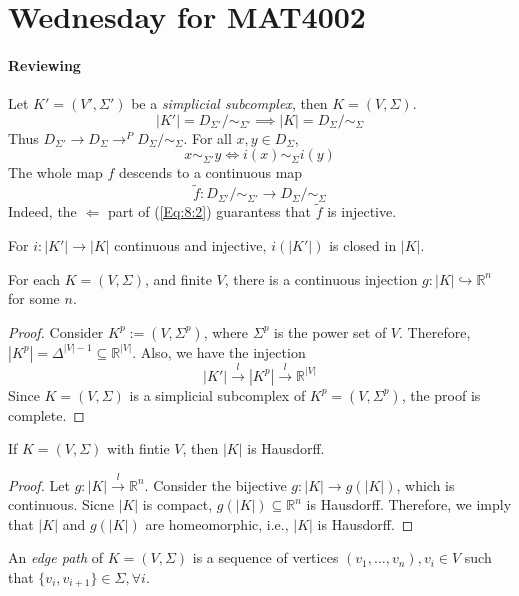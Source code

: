 \section{Wednesday for MAT4002}
\paragraph{Reviewing}
Let $K'=(V',\Sigma')$ be a \emph{simplicial subcomplex}, then $K=(V,\Sigma)$.
\[
|K'| = D_{\Sigma'}/\sim_{\Sigma'}\implies
|K| = D_{\Sigma}/\sim_{\Sigma}
\]
Thus $D_{\Sigma'}\to D_{\Sigma}\to^PD_{\Sigma}/\sim_{\Sigma}$.
For all $x,y\in D_{\Sigma}$, 
\begin{equation}\label{Eq:8:2}
x\sim_{\Sigma'}y\Longleftrightarrow
i(x)\sim_{\Sigma}i(y)
\end{equation}
The whole map $f$ descends to a continuous map
\[
\tilde{f}:D_{\Sigma'}/\sim_{\Sigma'}\to D_{\Sigma}/\sim_{\Sigma}
\]
Indeed, the $\Longleftarrow$ part of (\ref{Eq:8:2}) guarantess that $\tilde{f}$ is injective.

For $i:|K'|\to |K|$ continuous and injective, $i(|K'|)$ is closed in $|K|$.


\begin{proposition}
For each $K=(V,\Sigma)$, and finite $V$, 
there is a continuous injection 
$g:|K|\hookrightarrow\mathbb{R}^n$ for some $n$.
\end{proposition}

\begin{proof}
Consider $K^p:=(V,\Sigma^p)$, where $\Sigma^p$ is the power set of $V$.
Therefore, $|K^p| = \Delta^{|V|-1}\subseteq\mathbb{R}^{|V|}$. Also, we have the injection
\[
|K'|\xrightarrow{l}|K^p|\xrightarrow{l}\mathbb{R}^{|V|}
\]
Since $K=(V,\Sigma)$ is a simplicial subcomplex of $K^p=(V,\Sigma^p)$, the proof is complete.
\end{proof}

\begin{proposition}[Hausdorff]
If $K=(V,\Sigma)$ with fintie $V$, then $|K|$ is Hausdorff.
\end{proposition}

\begin{proof}
Let $g:|K|\xrightarrow{l}\mathbb{R}^n$.
Consider the bijective $g:|K|\to g(|K|)$, which is continuous.
Sicne $|K|$ is compact, $g(|K|)\subseteq \mathbb{R}^n$ is Hausdorff.
Therefore, we imply that $|K|$ and $g(|K|)$ are homeomorphic, i.e., $|K|$ is Hausdorff.
\end{proof}

\begin{definition}
An \emph{edge path} of $K=(V,\Sigma)$ is a sequence of vertices $(v_1,\dots,v_n), v_i\in V$ such that $\{v_i,v_{i+1}\}\in\Sigma,\forall i$.
\end{definition}

